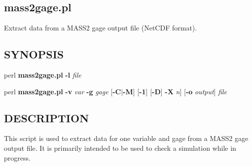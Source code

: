 \subsection{mass2gage.pl\label{mass2gage_pl}}


Extract data from a MASS2 gage output file (NetCDF format).

\subsection*{SYNOPSIS\label{mass2gage_pl_SYNOPSIS}}

perl \textbf{mass2gage.pl} \textbf{-l} \textit{file}



perl \textbf{mass2gage.pl} \textbf{-v} \textit{var} \textbf{-g} \textit{gage} [\textbf{-C}$|$\textbf{-M}] [\textbf{-1}]
[\textbf{-D}] \textbf{-X} \textit{n}] [\textbf{-o} \textit{output}] \textit{file}

\subsection*{DESCRIPTION\label{mass2gage_pl_DESCRIPTION}}

This script is used to extract data for one variable and gage from
a MASS2 gage output file.  It is primarily intended to be used to
check a simulation while in progress.

